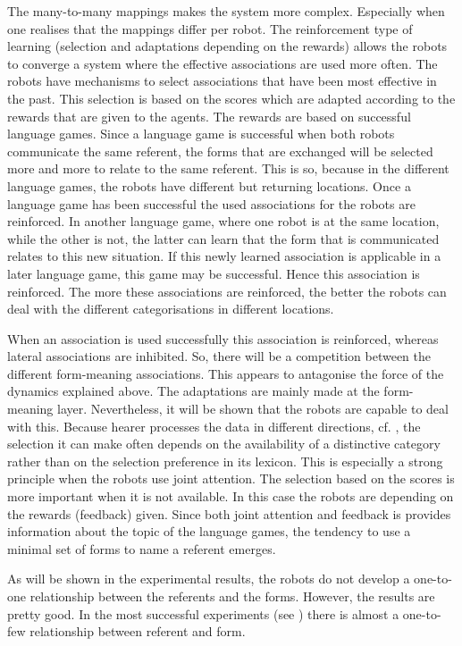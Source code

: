 The many-to-many mappings makes the system more complex. Especially when one realises that the mappings differ per robot. The reinforcement type of learning (selection and adaptations depending on the rewards) allows the robots to converge a system where the effective associations are used more often. The robots have mechanisms to select associations that have been most effective in the past. This selection is based on the scores which are adapted according to the rewards that are given to the agents. The rewards are based on successful language games. Since a language game is successful when both robots communicate the same referent, the forms that are exchanged will be selected more and more to relate to the same referent. This is so, because in the different language games, the robots have different but returning locations. Once a language game has been successful the used associations for the robots are reinforced. In another language game, where one robot is at the same location, while the other is not, the latter can learn that the form that is communicated relates to this new situation. If this newly learned association is applicable in a later language game, this game may be successful. Hence this association is reinforced. The more these associations are reinforced, the better the robots can deal with the different categorisations in different locations.

When an association is used successfully this association is reinforced, whereas lateral associations are inhibited. So, there will be a competition between the different form-meaning associations. This appears to antagonise the force of the dynamics explained above. The adaptations are mainly made at the form-meaning layer. Nevertheless, it will be shown that the robots are capable to deal with this. Because hearer processes the data in different directions, cf. , the selection it can make often depends on the availability of a distinctive category rather than on the selection preference in its lexicon. This is especially a strong principle when the robots use joint attention. The selection based on the scores is more important when it is not available. In this case the robots are depending on the rewards (feedback) given. Since both joint attention and feedback is provides information about the topic of the language games, the tendency to use a minimal set of forms to name a referent emerges.

As will be shown in the experimental results, the robots do not develop a one-to-one relationship between the referents and the forms. However, the results are pretty good. In the most successful experiments (see ) there is almost a one-to-few relationship between referent and form. 

